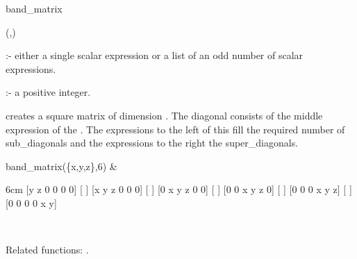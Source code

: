 \begin{Operator}{band_matrix}

\begin{Syntax}
(,)
\end{Syntax}

   :- either a single scalar expression or a list of 
                       an odd number of scalar expressions.

 :- a positive integer.

 creates a square matrix of dimension
. The diagonal consists of the middle expression
of the . The expressions to the left of this fill
the required number of sub\_diagonals and the expressions to the right 
the super\_diagonals. 

\begin{Examples}

band_matrix(\{x,y,z\},6) & 
\begin{multilineoutput}{6cm}
[y  z  0  0  0  0]
[                ]
[x  y  z  0  0  0]
[                ]
[0  x  y  z  0  0]
[                ]
[0  0  x  y  z  0]
[                ]
[0  0  0  x  y  z]
[                ]
[0  0  0  0  x  y]
\end{multilineoutput} \\
\end{Examples}

Related functions: .

\end{Operator}



